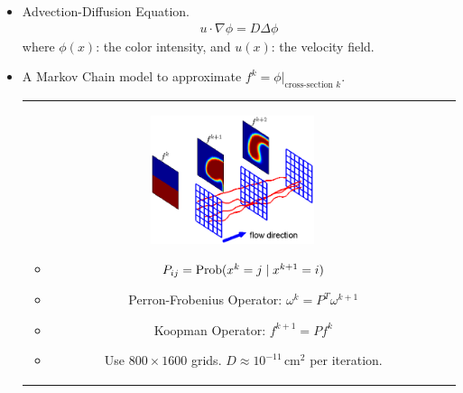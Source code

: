 \documentclass[12pt,t]{beamer}
\begin{document}
\begin{frame}
  \begin{itemize}
     \item Advection-Diffusion Equation.
        \begin{eqnarray*}
           \label{ade}
            u \cdot \nabla \phi = D \Delta \phi
        \end{eqnarray*}
     where $\phi(x)$: the color intensity, and $u(x)$: the velocity field. 
     \item A Markov Chain model to approximate $f^k = \phi|_{\text{cross-section } k}$.
       \begin{tabular}{cl}
         \includegraphics[width=0.4\textwidth,trim=2cm 0cm 1cm 0cm,clip]{markovchainmodel}
        \begin{minipage}[b]{6.2cm}
           \begin{itemize}
             \item $P_{ij} = \operatorname{Prob}(x^{k}=j \mid x^{k+1}=i)$
             \item Perron-Frobenius Operator: $\omega^{k} = P^T \omega^{k+1}$ 
             \item Koopman Operator: $f^{k+1} = P f^{k}$
             \item Use $800 \times 1600$ grids. $D\approx 10^{-11}\,\text{cm}^2$ per iteration.  
           \end{itemize}
        \end{minipage}
       \end{tabular}
  \end{itemize}


\end{frame}
\end{document}
